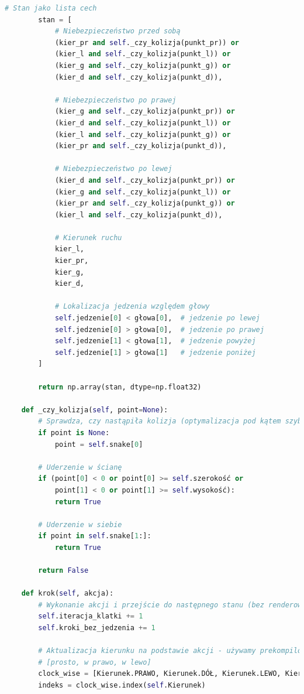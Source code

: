\documentclass[a4paper,12pt]{article}
\begin{document}
\begin{lstlisting}[language=Python]
        # Stan jako lista cech
        stan = [
            # Niebezpieczeństwo przed sobą
            (kier_pr and self._czy_kolizja(punkt_pr)) or
            (kier_l and self._czy_kolizja(punkt_l)) or
            (kier_g and self._czy_kolizja(punkt_g)) or
            (kier_d and self._czy_kolizja(punkt_d)),
            
            # Niebezpieczeństwo po prawej
            (kier_g and self._czy_kolizja(punkt_pr)) or
            (kier_d and self._czy_kolizja(punkt_l)) or
            (kier_l and self._czy_kolizja(punkt_g)) or
            (kier_pr and self._czy_kolizja(punkt_d)),
            
            # Niebezpieczeństwo po lewej
            (kier_d and self._czy_kolizja(punkt_pr)) or
            (kier_g and self._czy_kolizja(punkt_l)) or
            (kier_pr and self._czy_kolizja(punkt_g)) or
            (kier_l and self._czy_kolizja(punkt_d)),
            
            # Kierunek ruchu
            kier_l,
            kier_pr,
            kier_g,
            kier_d,
            
            # Lokalizacja jedzenia względem głowy
            self.jedzenie[0] < głowa[0],  # jedzenie po lewej
            self.jedzenie[0] > głowa[0],  # jedzenie po prawej
            self.jedzenie[1] < głowa[1],  # jedzenie powyżej
            self.jedzenie[1] > głowa[1]   # jedzenie poniżej
        ]
        
        return np.array(stan, dtype=np.float32)
    
    def _czy_kolizja(self, point=None):
        # Sprawdza, czy nastąpiła kolizja (optymalizacja pod kątem szybkości)
        if point is None:
            point = self.snake[0]
            
        # Uderzenie w ścianę
        if (point[0] < 0 or point[0] >= self.szerokość or 
            point[1] < 0 or point[1] >= self.wysokość):
            return True
        
        # Uderzenie w siebie
        if point in self.snake[1:]:
            return True
            
        return False
    
    def krok(self, akcja):
        # Wykonanie akcji i przejście do następnego stanu (bez renderowania)
        self.iteracja_klatki += 1
        self.kroki_bez_jedzenia += 1
        
        # Aktualizacja kierunku na podstawie akcji - używamy prekompilowanych stałych
        # [prosto, w prawo, w lewo]
        clock_wise = [Kierunek.PRAWO, Kierunek.DÓŁ, Kierunek.LEWO, Kierunek.GÓRA]
        indeks = clock_wise.index(self.Kierunek)
        

\end{lstlisting}
\end{document}
